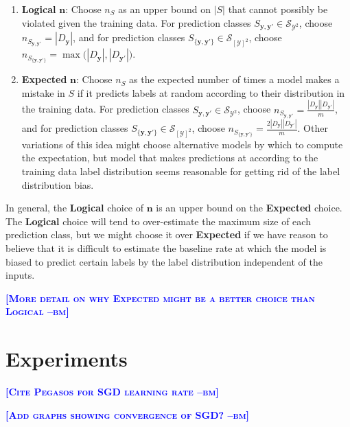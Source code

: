 \documentclass{article} %
\newcommand{\bmcomment}[1]{\textcolor{blue}{\textsc{\textbf{[#1 --bm]}}}}
\begin{document}
\begin{enumerate}

\item \textbf{Logical} $\mathbf{n}$: Choose $n_S$ as an upper bound
on $|S|$ that cannot possibly be violated given the training data. 
For prediction classes 
$S_{\mathbf{y},\mathbf{y'}}\in\mathcal{S}_{\mathcal{Y}^2}$, 
choose $n_{S_{\mathbf{y},\mathbf{y'}}}=|D_\mathbf{y}|$, and for prediction 
classes 
$S_{\{\mathbf{y},\mathbf{y'}\}}\in\mathcal{S}_{[\mathcal{Y}]^2}$,
choose 
$n_{S_{\{\mathbf{y},\mathbf{y'}\}}}=
\max\big(|D_\mathbf{y}|,|D_\mathbf{y'}|\big)$.

\item \textbf{Expected} $\mathbf{n}$:  Choose $n_S$ as the expected
number of times a model makes a mistake in $S$ if it predicts labels
at random according to their distribution in the training data. 
For prediction classes 
$S_{\mathbf{y},\mathbf{y'}}\in\mathcal{S}_{\mathcal{Y}^2}$, 
choose $n_{S_{\mathbf{y},\mathbf{y'}}}=
\frac{|D_\mathbf{y}||D_\mathbf{y'}|}{m}$, 
and for prediction classes 
$S_{\{\mathbf{y},\mathbf{y'}\}}\in\mathcal{S}_{[\mathcal{Y}]^2}$,
choose 
$n_{S_{\{\mathbf{y},\mathbf{y'}\}}}=
\frac{2|D_\mathbf{y}||D_\mathbf{y'}|}{m}$.
Other variations of this idea might choose alternative models by which
to compute the expectation, but model that makes predictions at
according to the training data label distribution seems 
reasonable for getting rid of the label distribution bias.

\end{enumerate}

In general, the \textbf{Logical} choice of $\mathbf{n}$ is an upper
bound on the \textbf{Expected} choice.  The \textbf{Logical} choice
will tend to over-estimate the maximum size of each prediction class,
but we might choose it over \textbf{Expected} if we have reason
to believe that it is difficult to estimate the baseline rate at
which the model is biased to predict certain labels by the label
distribution independent of the inputs.

\bmcomment{More detail on why Expected might be a better 
choice than Logical}

\section{Experiments}

\bmcomment{Cite Pegasos for SGD learning rate}

\bmcomment{Add graphs showing convergence of SGD?}
\end{document}
